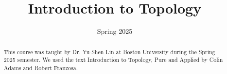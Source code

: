 \documentclass[11pt, letterpaper]{report}
\title{Introduction to Topology}
\date{Spring 2025}
\begin{document}
    \maketitle
\begin{abstract}
	This course was taught by Dr. Yu-Shen Lin at Boston University during the Spring 2025 semester. We used the text Introduction to Topology, Pure and Applied by Colin Adams and Robert Franzosa.
\end{abstract}
    \tableofcontents
    
    
    
    
    
    
    
    
    
    
    
    
    
    
    
    
    
    
    
    
    
    
    
    
\end{document}

